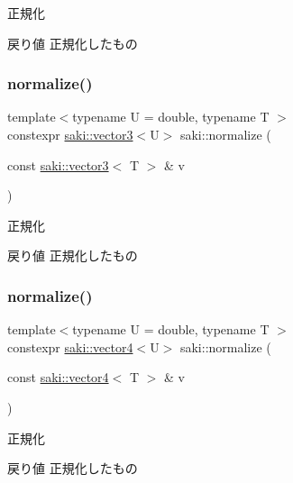 正規化 

\begin{DoxyReturn}{戻り値}
正規化したもの 
\end{DoxyReturn}
\mbox{\label{namespacesaki_aa38ed490dc1e7d5df7241eefd1c9453b}} 
\subsubsection{\texorpdfstring{normalize()}{normalize()}\hspace{0.1cm}{\footnotesize\ttfamily [2/3]}}
{\footnotesize\ttfamily template$<$typename U  = double, typename T $>$ \\
constexpr \mbox{\hyperlink{classsaki_1_1vector3}{saki\+::vector3}}$<$U$>$ saki\+::normalize (\begin{DoxyParamCaption}\item[{const \mbox{\hyperlink{classsaki_1_1vector3}{saki\+::vector3}}$<$ T $>$ \&}]{v }\end{DoxyParamCaption})}



正規化 

\begin{DoxyReturn}{戻り値}
正規化したもの 
\end{DoxyReturn}
\mbox{\label{namespacesaki_afcef74d7e32ef8cf446d075beeed4b41}} 
\subsubsection{\texorpdfstring{normalize()}{normalize()}\hspace{0.1cm}{\footnotesize\ttfamily [3/3]}}
{\footnotesize\ttfamily template$<$typename U  = double, typename T $>$ \\
constexpr \mbox{\hyperlink{classsaki_1_1vector4}{saki\+::vector4}}$<$U$>$ saki\+::normalize (\begin{DoxyParamCaption}\item[{const \mbox{\hyperlink{classsaki_1_1vector4}{saki\+::vector4}}$<$ T $>$ \&}]{v }\end{DoxyParamCaption})}



正規化 

\begin{DoxyReturn}{戻り値}
正規化したもの 
\end{DoxyReturn}
\mbox{\label{namespacesaki_aed742cc915a830fea9f4993c0a031c45}} 
